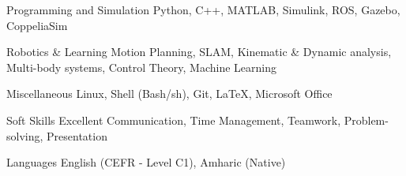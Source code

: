 

\begin{cvskills}

  \cvskill
    {Programming and Simulation} %
    {Python, C++, MATLAB, Simulink, ROS, Gazebo, CoppeliaSim} %

  \cvskill
    {Robotics \& Learning} %
    {Motion Planning, SLAM, Kinematic \& Dynamic analysis, Multi-body systems, Control Theory, Machine Learning} %

  \cvskill
    {Miscellaneous} %
    {Linux, Shell (Bash/sh), Git, \LaTeX , Microsoft Office} %
    
  \cvskill
    {Soft Skills} %
    {Excellent Communication, Time Management, Teamwork, Problem-solving, Presentation} %
    
  \cvskill
    {Languages} %
    {English (CEFR - Level C1), Amharic (Native)} %

\end{cvskills}
